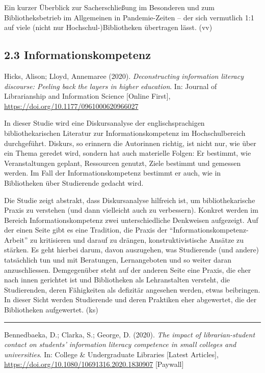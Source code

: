 \documentclass[a4paper,
fontsize=11pt,
oneside,
numbers=noperiodatend,
parskip=half-,
bibliography=totoc,
final
]{scrartcl}
\begin{document}
Ein kurzer Überblick zur Sacherschließung im Besonderen und zum
Bibliotheksbetrieb im Allgemeinen in Pandemie-Zeiten -- der sich
vermutlich 1:1 auf viele (nicht nur Hochschul-)Bibliothe\-ken übertragen
lässt. (vv)

\hypertarget{informationskompetenz}{%
\subsection{2.3 Informationskompetenz}\label{informationskompetenz}}

Hicks, Alison; Lloyd, Annemaree (2020). \emph{Deconstructing information
literacy discourse: Peeling back the layers in higher education}. In:
Journal of Librarianship and Information Science {[}Online First{]},
\url{https://doi.org/10.1177/0961000620966027}

In dieser Studie wird eine Diskursanalyse der englischsprachigen
bibliothekarischen Literatur zur Informationskompetenz im
Hochschulbereich durchgeführt. Diskurs, so erinnern die Autorinnen
richtig, ist nicht nur, wie über ein Thema geredet wird, sondern hat
auch materielle Folgen: Er bestimmt, wie Veranstaltungen geplant,
Ressourcen genutzt, Ziele bestimmt und gemessen werden. Im Fall der
Informationskompetenz bestimmt er auch, wie in Bibliotheken über
Studierende gedacht wird.

Die Studie zeigt abstrakt, dass Diskursanalyse hilfreich ist, um
bibliothekarische Praxis zu verstehen (und dann vielleicht auch zu
verbessern). Konkret werden im Bereich Informationskompetenz zwei
unterschiedliche Denkweisen aufgezeigt. Auf der einen Seite gibt es eine
Tradition, die Praxis der \enquote{Informationskompetenz-Arbeit} zu
kritisieren und darauf zu drängen, konstruktivistische Ansätze zu
stärken. Es geht hierbei darum, davon auszugehen, was Studierende (und
andere) tatsächlich tun und mit Beratungen, Lernangeboten und so weiter
daran anzuschliessen. Demgegenüber steht auf der anderen Seite eine
Praxis, die eher nach innen gerichtet ist und Bibliotheken als
Lehranstalten versteht, die Studierenden, deren Fähigkeiten als
defizitär angesehen werden, etwas beibringen. In dieser Sicht werden
Studierende und deren Praktiken eher abgewertet, die der Bibliotheken
aufgewertet. (ks)

\begin{center}\rule{0.5\linewidth}{0.5pt}\end{center}

Bennedbaeka, D.; Clarka, S.; George, D. (2020). \emph{The impact of
librarian-student contact on students' information literacy competence
in small colleges and universities}. In: College \& Undergraduate
Libraries {[}Latest Articles{]},
\url{https://doi.org/10.1080/10691316.2020.1830907} {[}Paywall{]}
\end{document}
